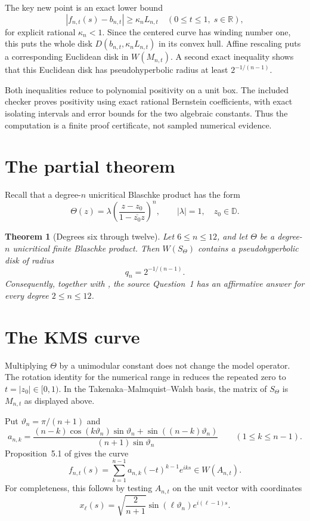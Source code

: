 \documentclass[11pt]{article}
\newtheorem{theorem}{Theorem}
\newcommand{\D}{\mathbb D}
\begin{document}
The key new point is an exact lower bound
\[
 |f_{n,t}(s)-b_{n,t}|\geq \kappa_n L_{n,t}
 \quad (0\leq t\leq1,\;s\in\mathbb R),
\]
for explicit rational $\kappa_n<1$.  Since the centered curve has winding
number one, this puts the whole disk
$D(b_{n,t},\kappa_nL_{n,t})$ in its convex hull.  Affine rescaling puts a
corresponding Euclidean disk in $W(M_{n,t})$.  A second exact inequality
shows that this Euclidean disk has pseudohyperbolic radius at least
$2^{-1/(n-1)}$.

Both inequalities reduce to polynomial positivity on a unit box.  The
included checker proves positivity using exact rational Bernstein
coefficients, with exact isolating intervals and error bounds for the two
algebraic constants.  Thus the computation is a finite proof certificate,
not sampled numerical evidence.

\section{The partial theorem}

Recall that a degree-$n$ unicritical Blaschke product has the form
\[
 \Theta(z)=\lambda\left(\frac{z-z_0}{1-\overline{z_0}z}\right)^n,
 \qquad |\lambda|=1,\quad z_0\in\D.
\]

\begin{theorem}[Degrees six through twelve]\label{thm:main}
Let $6\leq n\leq12$, and let $\Theta$ be a degree-$n$ unicritical finite
Blaschke product.  Then $W(S_\Theta)$ contains a pseudohyperbolic disk of
radius
\[
 q_n=2^{-1/(n-1)}.
\]
Consequently, together with \cite{BG21,BCGGV23}, the source Question~1 has
an affirmative answer for every degree $2\leq n\leq12$.
\end{theorem}

\section{The KMS curve}

Multiplying $\Theta$ by a unimodular constant does not change the model
operator.  The rotation identity for the numerical range in \cite{BG21}
reduces the repeated zero to $t=|z_0|\in[0,1)$.  In the
Takenaka--Malmquist--Walsh basis, the matrix of $S_\Theta$ is $M_{n,t}$ as
displayed above.

Put $\vartheta_n=\pi/(n+1)$ and
\[
 a_{n,k}=\frac{(n-k)\cos(k\vartheta_n)\sin\vartheta_n
 +\sin((n-k)\vartheta_n)}{(n+1)\sin\vartheta_n}
 \qquad(1\leq k\leq n-1).
\]
Proposition~5.1 of \cite{BG21} gives the curve
\begin{equation}\label{eq:curve}
 f_{n,t}(s)=\sum_{k=1}^{n-1}a_{n,k}(-t)^{k-1}e^{iks}
 \in W(A_{n,t}).
\end{equation}
For completeness, this follows by testing $A_{n,t}$ on the unit vector with
coordinates
\[
 x_\ell(s)=\sqrt{\frac{2}{n+1}}\sin(\ell\vartheta_n)e^{i(\ell-1)s}.
\]
\end{document}
